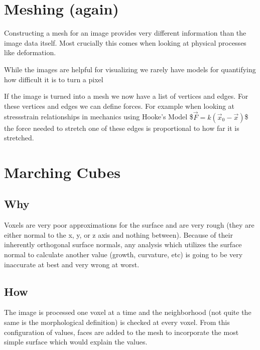 \documentclass[letterpaper,10pt,english]{sphinxmanual}
\begin{document}
\chapter{Meshing (again)}
\label{\detokenize{06-AdvancedShapeAndTexture:meshing-again}}
\sphinxAtStartPar
Constructing a mesh for an image provides very different information than the image data itself. Most crucially this comes when looking at physical processes like deformation.

\sphinxAtStartPar
While the images are helpful for visualizing we rarely have models for quantifying how difficult it is to turn a pixel 

\sphinxAtStartPar
If the image is turned into a mesh we now have a list of vertices and edges. For these vertices and edges we can define forces. For example when looking at stress\sphinxhyphen{}strain relationships in mechanics using Hooke’s Model
\$\( \vec{F}=k (\vec{x}_0-\vec{x}) \)\$
the force needed to stretch one of these edges is proportional to how far it is stretched.


\chapter{Marching Cubes}
\label{\detokenize{06-AdvancedShapeAndTexture:marching-cubes}}

\section{Why}
\label{\detokenize{06-AdvancedShapeAndTexture:why}}
\sphinxAtStartPar
Voxels are very poor approximations for the surface and are very rough (they are either normal to the x, y, or z axis and nothing between). Because of their inherently orthogonal surface normals, any analysis which utilizes the surface normal to calculate another value (growth, curvature, etc) is going to be very inaccurate at best and very wrong at worst.


\section{How}
\label{\detokenize{06-AdvancedShapeAndTexture:how}}
\sphinxAtStartPar
The image is processed one voxel at a time and the neighborhood (not quite the same is the morphological definition) is checked at every voxel. From this configuration of values, faces are added to the mesh to incorporate the most simple surface which would explain the values.
\end{document}
